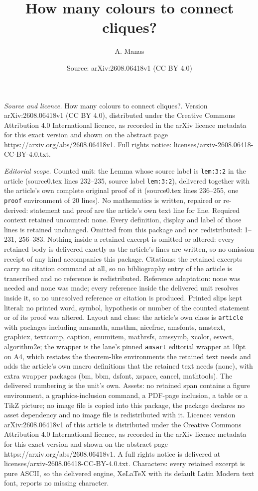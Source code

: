 \documentclass[10pt,a4paper]{amsart}
\title[How many colours to connect cliques?]{How many colours to connect cliques?}
\author{A. Manas}
\date{Source: arXiv:2608.06418v1 (CC BY 4.0)}
\begin{document}
\maketitle

\noindent\emph{Source and licence.} How many colours to connect cliques?. Version arXiv:2608.06418v1 (CC BY 4.0), distributed under the Creative Commons Attribution 4.0 International licence, as recorded in the arXiv licence metadata for this exact version and shown on the abstract page https://arxiv.org/abs/2608.06418v1. Full rights notice: licenses/arxiv-2608.06418-CC-BY-4.0.txt.\par\smallskip

\noindent\textit{Editorial scope.} Counted unit: the Lemma whose source label is \texttt{lem:3:2} in the article (source0.tex lines 232--235, source label \texttt{lem:3:2}), delivered together with the article's own complete original proof of it (source0.tex lines 236--255, one \texttt{proof} environment of 20 lines). No mathematics is written, repaired or re-derived: statement and proof are the article's own text line for line. Required context retained uncounted: none. Every definition, display and label of those lines is retained unchanged. Omitted from this package and not redistributed: 1--231, 256--383. Nothing inside a retained excerpt is omitted or altered: every retained body is delivered exactly as the article's lines are written, so no omission receipt of any kind accompanies this package. Citations: the retained excerpts carry no citation command at all, so no bibliography entry of the article is transcribed and no reference is redistributed. Reference adaptation: none was needed and none was made; every reference inside the delivered unit resolves inside it, so no unresolved reference or citation is produced. Printed slips kept literal: no printed word, symbol, hypothesis or number of the counted statement or of its proof was altered. Layout and class: the article's own class is \texttt{article} with packages including amsmath, amsthm, nicefrac, amsfonts, amstext, graphicx, textcomp, caption, enumitem, mathrsfs, amssymb, xcolor, esvect, algorithm2e; the wrapper is the lane's pinned \texttt{amsart} editorial wrapper at 10pt on A4, which restates the theorem-like environments the retained text needs and adds the article's own macro definitions that the retained text needs (none), with extra wrapper packages (bm, bbm, dsfont, xspace, cancel, mathtools). The delivered numbering is the unit's own. Assets: no retained span contains a figure environment, a graphics-inclusion command, a PDF-page inclusion, a table or a TikZ picture; no image file is copied into this package, the package declares no asset dependency and no image file is redistributed with it. Licence: version arXiv:2608.06418v1 of this article is distributed under the Creative Commons Attribution 4.0 International licence, as recorded in the arXiv licence metadata for this exact version and shown on the abstract page https://arxiv.org/abs/2608.06418v1. A full rights notice is delivered at licenses/arxiv-2608.06418-CC-BY-4.0.txt. Characters: every retained excerpt is pure ASCII, so the delivered engine, XeLaTeX with its default Latin Modern text font, reports no missing character.
\end{document}
